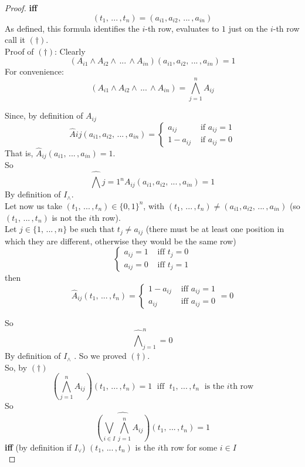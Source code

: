 \begin{proof}
		\textbf{iff}
		$$ (t_1, \, ... \, , t_n) =  (a_{i1}, a_{i2}, \, ... \, , a_{in}) $$
		As defined, this formula identifies the $i$-th row, evaluates to $1$ just on the $i$-th row call it $(\dag)$. \\

		Proof of $(\dag)$: Clearly
		$$ \left(A_{i1} \wedge A_{i2} \wedge \, ... \, \wedge A_{in}\right) (a_{i1}, a_{i2}, \, ... \, , a_{in}) = 1 $$
		For convenience:
		$$ \left(A_{i1} \wedge A_{i2} \wedge \, ... \, \wedge A_{in}\right) = \bigwedge_{j = 1}^n A_{ij} $$

		Since, by definition of $A_{ij}$
		$$ \hat A{ij} (a_{i1}, a_{i2}, \, ... \, , a_{in})  = \begin{cases}
			a_{ij} & \text{ if } a_{ij} = 1\\
			1 - a_{ij} & \text{ if } a_{ij} = 0
		\end{cases}$$
		That is, $\hat A_{ij} (a_{i1}, \, ... \, , a_{in}) = 1$.\\
		So
		$$ \widehat \bigwedge{j=1}^n A_{ij} (a_{i1}, a_{i2}, \, ... \, , a_{in}) = 1$$
		By definition of $I_\wedge$.\\

		Let now us take $(t_1, \, ... \, , t_n) \in \{0,1\}^n$, with $(t_1, \, ... \, , t_n) \neq (a_{i1}, a_{i2}, \, ... \, , a_{in})$ (so $(t_1, \, ... \, , t_n)$ is not the $i$th row).\\

		Let $j \in \{1, \, ... \, , n\}$ be such that $t_j \neq a_{ij}$ (there must be at least one position in which they are different, otherwise they would be the same row)
		$$
		\begin{cases}
			a_{ij} = 1 & \text{ iff } t_j = 0 \\
			a_{ij} = 0 & \text{ iff } t_j = 1
		\end{cases}
		$$
		then
		$$ \hat A_{ij} (t_1, \, ... \, , t_n) =
		\begin{cases}
			1 - a_{ij} & \text{ iff } a_{ij} = 1 \\
			a_{ij} & \text{ iff } a_{ij} = 0
		\end{cases}
		= 0
		$$

		So
		$$ \widehat \bigwedge_{j=1}^n = 0$$
		By definition of $I_\wedge$ . So we proved $(\dag)$.\\

		So, by $(\dag)$
		$$ \left( \bigwedge_{j=1}^n A_{ij} \right) (t_1, \, ... \, , t_n) = 1 \; \text{ iff } \; t_1, \, ... \, , t_n \; \text{ is the } i \text{th row} $$
		So
		$$\widehat{\left( \bigvee_{i \in I} \bigwedge_{j=1}^n A_{ij}\right)} (t_1, \, ... \, , t_n)  = 1 $$
		\textbf{iff} (by definition if $I_\vee$) $(t_1, \, ... \, , t_n)$ is the $i$th row for some $i \in I$\\


\end{proof}
